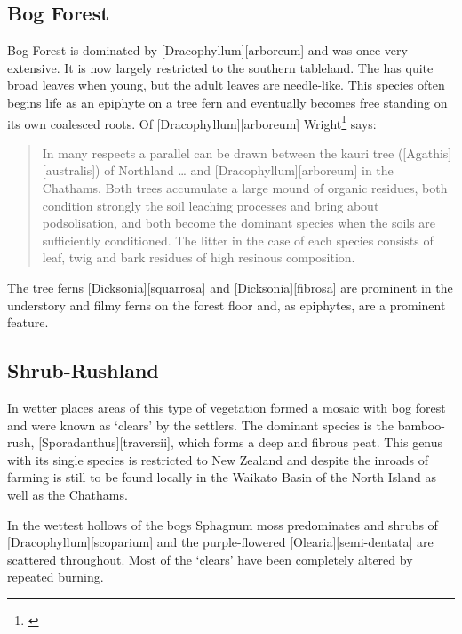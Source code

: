 \subsection{Bog Forest}

Bog Forest is dominated by [Dracophyllum][arboreum] and was once very extensive.
It is now largely restricted to the southern tableland.
The  has quite broad leaves when young, but the adult leaves are needle-like.
This species often begins life as an epiphyte on a tree fern and eventually becomes free standing on its own coalesced roots.
Of [Dracophyllum][arboreum] Wright\footnote{\cite{wright1959soils}} says:

\begin{quote}
	In many respects a parallel can be drawn between the kauri tree ([Agathis][australis]) of Northland … and [Dracophyllum][arboreum] in the Chathams.
	Both trees accumulate a large mound of organic residues, both condition strongly the soil leaching processes and bring about podsolisation, and both become the dominant species when the soils are sufficiently conditioned.
	The litter in the case of each species consists of leaf, twig and bark residues of high resinous composition.
\end{quote}

The tree ferns [Dicksonia][squarrosa] and [Dicksonia][fibrosa] are prominent in the understory and filmy ferns on the forest floor and, as epiphytes, are a prominent feature.

\subsection{Shrub-Rushland}

In wetter places areas of this type of vegetation formed a mosaic with bog forest and were known as `clears' by the settlers.
The dominant species is the bamboo-rush, [Sporadanthus][traversii], which forms a deep and fibrous peat.
This genus with its single species is restricted to New Zealand and despite the inroads of farming is still to be found locally in the Waikato Basin of the North Island as well as the Chathams.

In the wettest hollows of the bogs Sphagnum moss predominates and shrubs of [Dracophyllum][scoparium] and the purple-flowered [Olearia][semi-dentata] are scattered throughout.
Most of the `clears' have been completely altered by repeated burning.

